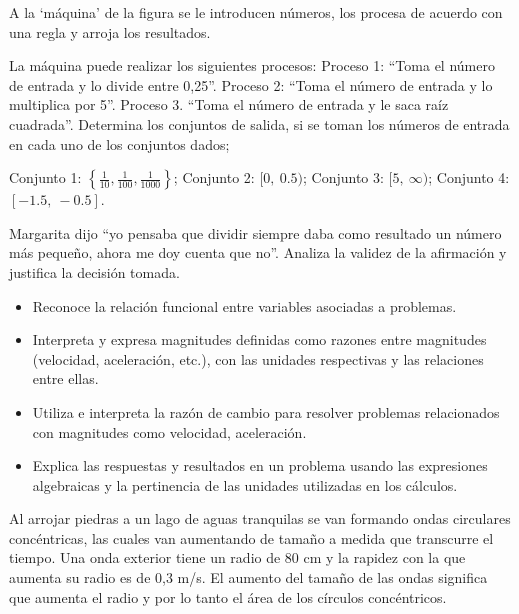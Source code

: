 \ejemplo

A la ‘máquina’ de la figura se le introducen números, los procesa de acuerdo con una regla y arroja los resultados.


La máquina puede realizar los siguientes procesos: Proceso 1: “Toma el número de entrada y lo divide entre 0,25”. Proceso 2: “Toma el número de entrada y lo multiplica por 5”. Proceso 3. “Toma el número de entrada y le saca raíz cuadrada”. Determina los conjuntos de salida, si se toman los números de entrada en cada uno de los conjuntos dados;

Conjunto 1: $\left\{\frac{1}{10}, \frac{1}{100}, \frac{1}{1000}\right\}$; Conjunto 2: $[0,\ 0.5)$; Conjunto 3: $[5,\ \infty)$; Conjunto 4: $[-1.5,\ -0.5]$.

Margarita dijo “yo pensaba que dividir siempre daba como resultado un número más pequeño, ahora me doy cuenta que no”. Analiza la validez de la afirmación y justifica la decisión tomada.


\evidencias

\begin{itemize}
  \item Reconoce la relación funcional entre variables asociadas a problemas.
  \item Interpreta y expresa magnitudes definidas como razones entre magnitudes (velocidad, aceleración, etc.), con las unidades respectivas y las relaciones entre ellas.
  \item Utiliza e interpreta la razón de cambio para resolver problemas relacionados con magnitudes como velocidad, aceleración.
  \item Explica las respuestas y resultados en un problema usando las expresiones algebraicas y la pertinencia de las unidades utilizadas en los cálculos.
\end{itemize}

\ejemplo

Al arrojar piedras a un lago de aguas tranquilas se van formando ondas circulares concéntricas, las cuales van aumentando de tamaño a medida que transcurre el tiempo. Una onda exterior tiene un radio de 80 cm y la rapidez con la que aumenta su radio es de 0,3 m/s. El aumento del tamaño de las ondas significa que aumenta el radio y por lo tanto el área de los círculos concéntricos.

